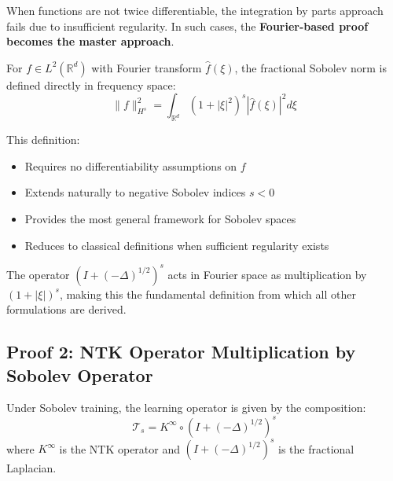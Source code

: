 \documentclass[a4paper]{article}
\begin{document}
\begin{remark}
When functions are not twice differentiable, the integration by parts approach fails due to insufficient regularity. In such cases, the \textbf{Fourier-based proof becomes the master approach}.

For $f \in L^2(\mathbb{R}^d)$ with Fourier transform $\hat{f}(\xi)$, the fractional Sobolev norm is defined directly in frequency space:
\[ \|f\|_{H^s}^2 = \int_{\mathbb{R}^d} (1 + |\xi|^2)^s |\hat{f}(\xi)|^2 d\xi \]

This definition:
\begin{itemize}
\item Requires no differentiability assumptions on $f$
\item Extends naturally to negative Sobolev indices $s < 0$
\item Provides the most general framework for Sobolev spaces
\item Reduces to classical definitions when sufficient regularity exists
\end{itemize}

The operator $(I + (-\Delta)^{1/2})^s$ acts in Fourier space as multiplication by $(1 + |\xi|)^s$, making this the fundamental definition from which all other formulations are derived.
\end{remark}

\subsection{Proof 2: NTK Operator Multiplication by Sobolev Operator}

\begin{theorem}
Under Sobolev training, the learning operator is given by the composition:
\[ \mathcal{T}_s = K^{\infty} \circ (I + (-\Delta)^{1/2})^s \]
where $K^{\infty}$ is the NTK operator and $(I + (-\Delta)^{1/2})^s$ is the fractional Laplacian.
\end{theorem}
\end{document}
